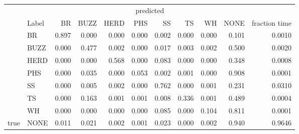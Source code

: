 
\begin{tabular}[t]{llrrrrrrrrr}
\toprule
\multicolumn{2}{c}{ } & \multicolumn{8}{c}{predicted} & \multicolumn{1}{c}{ } \\
\cmidrule(l{3pt}r{3pt}){3-10}
  & Label & BR & BUZZ & HERD & PHS & SS & TS & WH & NONE & fraction time\\
\midrule
 & BR & 0.897 & 0.000 & 0.000 & 0.000 & 0.002 & 0.000 & 0.000 & 0.101 & 0.0010\\

 & BUZZ & 0.000 & 0.477 & 0.002 & 0.000 & 0.017 & 0.003 & 0.002 & 0.500 & 0.0020\\

 & HERD & 0.000 & 0.000 & 0.568 & 0.000 & 0.083 & 0.000 & 0.000 & 0.348 & 0.0008\\

 & PHS & 0.000 & 0.035 & 0.000 & 0.053 & 0.002 & 0.001 & 0.000 & 0.908 & 0.0001\\

 & SS & 0.000 & 0.005 & 0.002 & 0.000 & 0.762 & 0.000 & 0.001 & 0.231 & 0.0310\\

 & TS & 0.000 & 0.163 & 0.001 & 0.001 & 0.008 & 0.336 & 0.001 & 0.489 & 0.0004\\

 & WH & 0.000 & 0.000 & 0.000 & 0.000 & 0.085 & 0.000 & 0.104 & 0.811 & 0.0001\\

\multirow{-8}{*}{\raggedright\arraybackslash true} & NONE & 0.011 & 0.021 & 0.002 & 0.001 & 0.023 & 0.000 & 0.002 & 0.940 & 0.9646\\
\bottomrule
\end{tabular}
